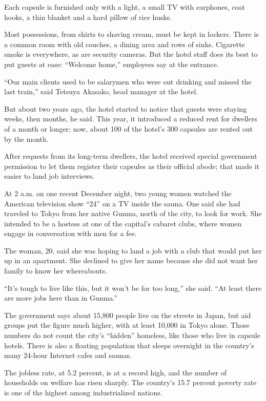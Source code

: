 ﻿\documentclass[12pt]{article}
\begin{document}
Each capsule is furnished only with a light, a small TV with earphones, coat hooks, a thin blanket
and a hard pillow of rice husks.

Most possessions, from shirts to shaving cream, must be kept in lockers. There is a common room with
old couches, a dining area and rows of sinks. Cigarette smoke is everywhere, as are security
cameras. But the hotel staff does its best to put guests at ease: ``Welcome home,'' employees say at
the entrance.

``Our main clients used to be salarymen who were out drinking and missed the last train,'' said
Tetsuya Akasako, head manager at the hotel.

But about two years ago, the hotel started to notice that guests were staying weeks, then months, he
said. This year, it introduced a reduced rent for dwellers of a month or longer; now, about 100 of
the hotel's 300 capsules are rented out by the month.

After requests from its long-term dwellers, the hotel received special government permission to let
them register their capsules as their official abode; that made it easier to land job interviews.

At 2 a.m. on one recent December night, two young women watched the American television show ``24''
on a TV inside the sauna. One said she had traveled to Tokyo from her native Gunma, north of the
city, to look for work. She intended to be a hostess at one of the capital's cabaret clubs, where
women engage in conversation with men for a fee.

The woman, 20, said she was hoping to land a job with a club that would put her up in an apartment.
She declined to give her name because she did not want her family to know her whereabouts.

``It's tough to live like this, but it won't be for too long,'' she said. ``At least there are more
jobs here than in Gunma.''

The government says about 15,800 people live on the streets in Japan, but aid groups put the figure
much higher, with at least 10,000 in Tokyo alone. Those numbers do not count the city's ``hidden''
homeless, like those who live in capsule hotels. There is also a floating population that sleeps
overnight in the country's many 24-hour Internet cafes and saunas.

The jobless rate, at 5.2 percent, is at a record high, and the number of households on welfare has
risen sharply. The country's 15.7 percent poverty rate is one of the highest among industrialized
nations.
\end{document}
